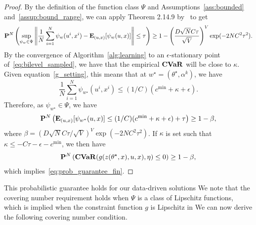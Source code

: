 \begin{proof}
By the definition of the function class $\Psi$ and Assumptions~\ref{ass:bounded} and~\ref{assup:bound_range}, we can apply Theorem 2.14.9 by~\cite{empirical} to get
$${\mathbf P}^{N}\left (\sup_{\psi_{w} \in \Psi} \left \|\frac{1}{N}\sum_{i=1}^N \psi_{w}(u^i, x^i) - \mathbf{E}_{(u,x)}[\psi_{w}(u,x)] \right \| \leq \tau\right ) \geq 1 - \left (\frac{D\sqrt{N}C\tau}{\sqrt{V}}\right )^V\exp(-2NC^2\tau^2).$$
By the convergence of Algorithm~\ref{alg:learning} to an $\epsilon$-stationary point of~\eqref{eq:bilevel_sampled},
we have that the empirical $\mathop{\bf CVaR}$ will be close to $\kappa$. Given equation~\eqref{g_setting}, this means that at $w^\star = (\theta^\star, \alpha^k)$, we have
$$\frac{1}{N}\sum_{i=1}^N \psi_{{w}^{\star}}(u^i, x^i) \leq (1/C)(c^{\min} + \kappa+ \epsilon).$$
Therefore, as $\psi_{{w}^{\star}} \in \Psi$, we have
$${\mathbf P}^{N}\left ( \mathbf{E}_{(u,x)}[\psi_{w^\star}(u,x)] \leq (1/C)(c^{\min}+ \kappa+\epsilon) + \tau\right ) \geq 1 - \beta,$$
where $\beta =(D\sqrt{N}C\tau/\sqrt{V})^V\exp(-2NC^2\tau^2)$.
If $\kappa$ is set such that $\kappa \leq -C\tau - \epsilon - c^{\min}$, we then have
$${\mathbf P}^{N}\left (\mathop{\bf CVaR}(g(z(\theta^\star,x),u,x),\eta)\leq 0 \right ) \geq 1 - \beta,$$
which implies~\eqref{eq:prob_guarantee_fin}.
\end{proof}
This probabilistic guarantee holds for our data-driven solutions  
We note that the covering number requirement holds when $\Psi$ is a class of Lipschitz functions, which is implied when the constraint function $g$ is Lipschitz in 
We can now derive the following covering number condition.
